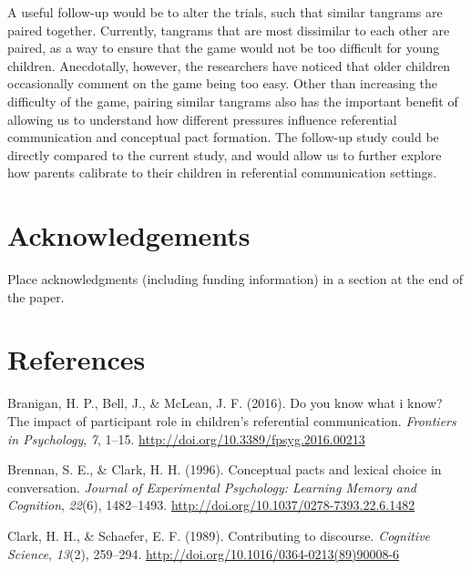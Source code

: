 \documentclass[10pt, letterpaper]{article}
\begin{document}
A useful follow-up would be to alter the trials, such that similar
tangrams are paired together. Currently, tangrams that are most
dissimilar to each other are paired, as a way to ensure that the game
would not be too difficult for young children. Anecdotally, however, the
researchers have noticed that older children occasionally comment on the
game being too easy. Other than increasing the difficulty of the game,
pairing similar tangrams also has the important benefit of allowing us
to understand how different pressures influence referential
communication and conceptual pact formation. The follow-up study could
be directly compared to the current study, and would allow us to further
explore how parents calibrate to their children in referential
communication settings.

\hypertarget{acknowledgements}{%
\section{Acknowledgements}\label{acknowledgements}}

Place acknowledgments (including funding information) in a section at
the end of the paper.

\hypertarget{references}{%
\section{References}\label{references}}

\setlength{\parindent}{-0.1in} 
\setlength{\leftskip}{0.125in}

\noindent

\hypertarget{refs}{}
\leavevmode\hypertarget{ref-Branigan2016Do}{}%
Branigan, H. P., Bell, J., \& McLean, J. F. (2016). Do you know what i
know? The impact of participant role in children's referential
communication. \emph{Frontiers in Psychology}, \emph{7}, 1--15.
\url{http://doi.org/10.3389/fpsyg.2016.00213}

\leavevmode\hypertarget{ref-Brennan1996Conceptual}{}%
Brennan, S. E., \& Clark, H. H. (1996). Conceptual pacts and lexical
choice in conversation. \emph{Journal of Experimental Psychology:
Learning Memory and Cognition}, \emph{22}(6), 1482--1493.
\url{http://doi.org/10.1037/0278-7393.22.6.1482}

\leavevmode\hypertarget{ref-Clark1989Contributing}{}%
Clark, H. H., \& Schaefer, E. F. (1989). Contributing to discourse.
\emph{Cognitive Science}, \emph{13}(2), 259--294.
\url{http://doi.org/10.1016/0364-0213(89)90008-6}
\end{document}

